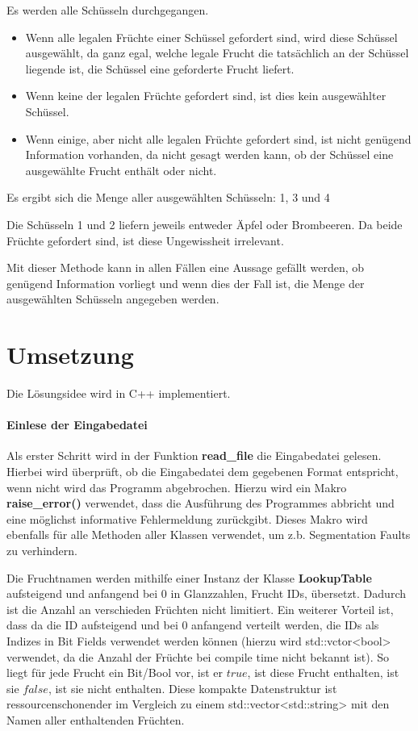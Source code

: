 \documentclass[a4paper,10pt,ngerman]{scrartcl}
\begin{document}
Es werden alle Schüsseln durchgegangen.
\begin{itemize}
    \item Wenn alle legalen Früchte einer Schüssel gefordert sind, wird diese Schüssel ausgewählt, da ganz egal, welche legale Frucht die tatsächlich an der Schüssel liegende ist, die Schüssel eine geforderte Frucht liefert.
    \item Wenn keine der legalen Früchte gefordert sind, ist dies kein ausgewählter Schüssel.
    \item Wenn einige, aber nicht alle legalen Früchte gefordert sind, ist nicht genügend Information vorhanden, da nicht gesagt werden kann, ob der Schüssel eine ausgewählte Frucht enthält oder nicht.
\end{itemize}
Es ergibt sich die Menge aller ausgewählten Schüsseln: 1, 3 und 4

Die Schüsseln 1 und 2 liefern jeweils entweder Äpfel oder Brombeeren.
Da beide Früchte gefordert sind, ist diese Ungewissheit irrelevant.

Mit dieser Methode kann in allen Fällen eine Aussage gefällt werden, ob genügend Information vorliegt und wenn dies der Fall ist, die Menge der ausgewählten Schüsseln angegeben werden.

\section{Umsetzung}
Die Lösungsidee wird in C++ implementiert.

\paragraph{Einlese der Eingabedatei}
Als erster Schritt wird in der Funktion \textbf{read\_file} die Eingabedatei gelesen.
Hierbei wird überprüft, ob die Eingabedatei dem gegebenen Format entspricht, wenn nicht wird das Programm abgebrochen.
Hierzu wird ein Makro \textbf{raise\_error()} verwendet, dass die Ausführung des Programmes abbricht und eine möglichst informative Fehlermeldung zurückgibt.
Dieses Makro wird ebenfalls für alle Methoden aller Klassen verwendet, um z.b. Segmentation Faults zu verhindern.

Die Fruchtnamen werden mithilfe einer Instanz der Klasse \textbf{LookupTable} aufsteigend und anfangend bei $0$ in Glanzzahlen, Frucht IDs, übersetzt.
Dadurch ist die Anzahl an verschieden Früchten nicht limitiert.
Ein weiterer Vorteil ist, dass da die ID aufsteigend und bei $0$ anfangend verteilt werden, die IDs als Indizes in Bit Fields verwendet werden können (hierzu wird std::vctor<bool> verwendet, da die Anzahl der Früchte bei compile time nicht bekannt ist).
So liegt für jede Frucht ein Bit/Bool vor, ist er $true$, ist diese Frucht enthalten, ist sie $false$, ist sie nicht enthalten.
Diese kompakte Datenstruktur ist ressourcenschonender im Vergleich zu einem std::vector<std::string> mit den Namen aller enthaltenden Früchten.
\end{document}
